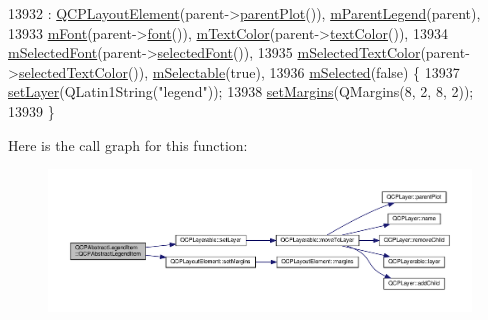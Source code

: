 \begin{DoxyCode}
13932     : \hyperlink{class_q_c_p_layout_element_a8947f0ada17e672aaba3d424cbbb67e3}{QCPLayoutElement}(parent->\hyperlink{class_q_c_p_layerable_ab7e0e94461566093d36ffc0f5312b109}{parentPlot}()), 
      \hyperlink{class_q_c_p_abstract_legend_item_aafcd9fc6fcb10f4a8d46037011afafe8}{mParentLegend}(parent),
13933       \hyperlink{class_q_c_p_abstract_legend_item_ae916a78ac0d2a60e20a17ca2f24f9754}{mFont}(parent->\hyperlink{class_q_c_p_legend_a5cf8b840bc02f7bf4edb8dde400d0f41}{font}()), \hyperlink{class_q_c_p_abstract_legend_item_a974b21e9930227d281344bd2242d289d}{mTextColor}(parent->\hyperlink{class_q_c_p_legend_ad60a058af7491f6b140c104c6a0f9458}{textColor}()),
13934       \hyperlink{class_q_c_p_abstract_legend_item_ab971df604306b192875a7d097feb1e21}{mSelectedFont}(parent->\hyperlink{class_q_c_p_legend_a4c1b08fc0afacb4ffd54f6a49737fa77}{selectedFont}()),
13935       \hyperlink{class_q_c_p_abstract_legend_item_a4965c13854d970b24c284f0a4f005fbd}{mSelectedTextColor}(parent->\hyperlink{class_q_c_p_legend_a08005f3c17728c2c4e23b8ffc0842ffb}{selectedTextColor}()), 
      \hyperlink{class_q_c_p_abstract_legend_item_aa84029f57b1b32f642fb7db63c3fc2c2}{mSelectable}(\textcolor{keyword}{true}),
13936       \hyperlink{class_q_c_p_abstract_legend_item_ae58ebebbd0c36cc6fe897483369984d2}{mSelected}(\textcolor{keyword}{false}) \{
13937   \hyperlink{class_q_c_p_layerable_ab0d0da6d2de45a118886d2c8e16d5a54}{setLayer}(QLatin1String(\textcolor{stringliteral}{"legend"}));
13938   \hyperlink{class_q_c_p_layout_element_a8f450b1f3f992ad576fce2c63d8b79cf}{setMargins}(QMargins(8, 2, 8, 2));
13939 \}
\end{DoxyCode}


Here is the call graph for this function\+:\nopagebreak
\begin{figure}[H]
\begin{center}
\leavevmode
\includegraphics[width=350pt]{class_q_c_p_abstract_legend_item_afaff87610e8da0fa238ecf552872d774_cgraph}
\end{center}
\end{figure}




